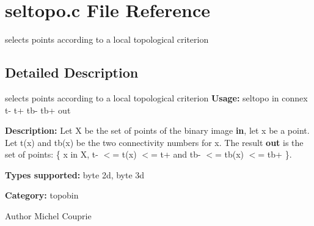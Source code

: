 \section{seltopo.c File Reference}
\label{seltopo_8c}


selects points according to a local topological criterion  




\subsection{Detailed Description}
selects points according to a local topological criterion {\bfseries Usage:} seltopo in connex t-\/ t+ tb-\/ tb+ out

{\bfseries Description:} Let X be the set of points of the binary image {\bfseries in}, let x be a point. Let t(x) and tb(x) be the two connectivity numbers for x. The result {\bfseries out} is the set of points: \{ x in X, t-\/ $<$= t(x) $<$= t+ and tb-\/ $<$= tb(x) $<$= tb+ \}.

{\bfseries Types supported:} byte 2d, byte 3d

{\bfseries Category:} topobin

\begin{DoxyAuthor}{Author}
Michel Couprie 
\end{DoxyAuthor}
